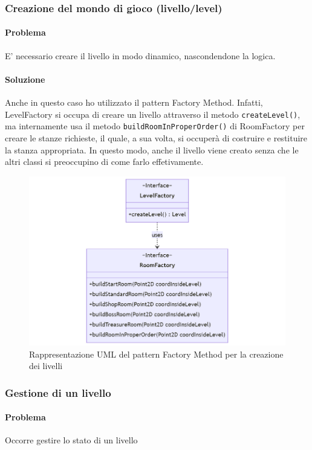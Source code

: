 \documentclass[a4paper,12pt]{report}
\begin{document}
\subsubsection{Creazione del mondo di gioco (livello/level)}
\paragraph{Problema} E' necessario creare il livello in modo dinamico, nascondendone la logica.
\paragraph{Soluzione} Anche in questo caso ho utilizzato il pattern Factory Method.
Infatti, LevelFactory si occupa di creare un livello attraverso il 
metodo \texttt{createLevel()}, ma internamente usa il metodo \texttt{buildRoomInProperOrder()} di RoomFactory per creare le stanze richieste, il quale, a sua volta, si occuperà di costruire e restituire la stanza appropriata.
In questo modo, anche il livello viene creato senza che le altri classi si preoccupino di come farlo effetivamente.

\begin{figure}[H]
    \centering{}
    \includegraphics[scale=0.5]{diagram/levelFactory.png}
    \caption{Rappresentazione UML del pattern Factory Method per la creazione dei livelli}
    \label{img:levelFactory}
\end{figure}


\subsubsection{Gestione di un livello}
\paragraph{Problema} Occorre gestire lo stato di un livello
\end{document}
